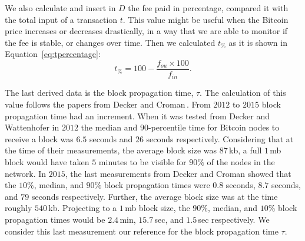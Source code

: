 \documentclass[USenglish]{uit-thesis}
\begin{document}
We also calculate and insert in $D$ the fee paid in percentage,
compared it with the total input of a transaction $t$.
This value might be useful when the
Bitcoin price increases or decreases drastically, in a way that we are
able to monitor if the fee is stable, or changes over time.
Then we calculated $t_\%$ as it is shown in
Equation~\ref{eq:tpercentage}:
\begin{equation}
\label{eq:tpercentage}
t_\% = 100 - \frac{f_{ou} \times 100}{f_{in}}.
\end{equation}

The last derived data is the block propagation time, $\tau$.
The calculation
of this value follows the papers from Decker and
Croman\,\cite{Decker2013IPBN, croman2016}. From $2012$
to $2015$ block propagation time had an increment.
When it was tested from Decker and Wattenhofer in
$2012$ the median and $90$-percentile time for Bitcoin
nodes to receive a block was $6.5$ seconds and
$26$ seconds respectively. Considering that
at the time of their measurements, the average block size was $87$\,\gls{kb},
a full $1$\,\gls{mb} block would have taken $5$ minutes to be
visible for $90\%$ of the nodes in the network.
In $2015$, the last measurements from Decker and Croman showed
that the $10\%$, median, and $90\%$ block propagation times were
$0.8$ seconds, $8.7$ seconds, and $79$ seconds respectively.
Further, the average block size was at the time roughly $540$\,\gls{kb}.
Projecting to a $1$\,\gls{mb} block size, the $90\%$, median, and
$10\%$ block propagation times would be $2.4$\,min, $15.7$\,sec,
and $1.5$\,sec respectively. We consider this last measurement
our reference for the block propagation time $\tau$.
\end{document}
